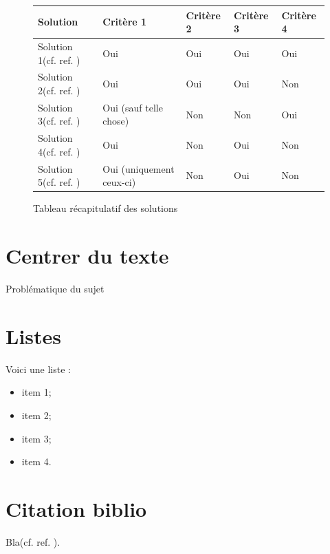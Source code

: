 \begin{figure}[!ht]
\begin{center}
\begin{tabular}{|l|l|l|l|l|}
  \hline
  Solution & Critère 1 & Critère 2 & Critère 3 & Critère 4\\
  \hline
  Solution 1(cf. ref. \cite{vaughnShaderResources2021}) & Oui & Oui & Oui & Oui \\
  Solution 2(cf. ref. \cite{vaughnShaderResources2021}) & Oui & Oui & Oui & Non \\
  Solution 3(cf. ref. \cite{vaughnShaderResources2021}) & Oui (sauf telle chose) & Non & Non & Oui\\
  Solution 4(cf. ref. \cite{vaughnShaderResources2021}) & Oui& Non & Oui & Non\\
  Solution 5(cf. ref. \cite{vaughnShaderResources2021}) & Oui (uniquement ceux-ci) & Non & Oui & Non\\
  \hline
\end{tabular}
\end{center}
\caption{Tableau récapitulatif des solutions}
\end{figure}


{}

\newpage

\section{Centrer du texte}

\begin{center}
Problématique du sujet
\end{center}

\section{Listes}


Voici une liste :
\begin{itemize}
\item item 1;
\item item 2;
\item item 3;
\item item 4.
\end{itemize}


\section{Citation biblio}


Bla(cf. ref. \cite{vaughnShaderResources2021}).


